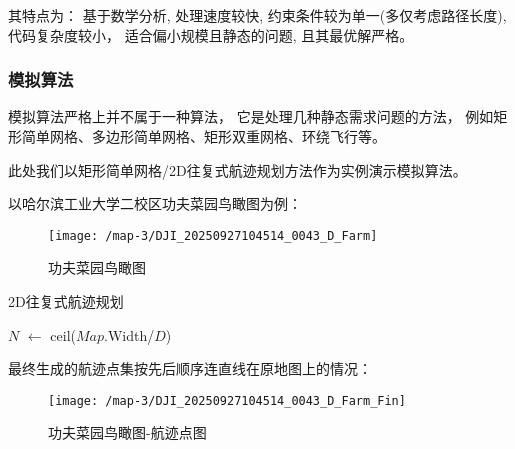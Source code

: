 \documentclass[12pt,a4paper,oneside,UTF8]{ctexart}
\begin{document}
其特点为：
基于数学分析,
处理速度较快,
约束条件较为单一(多仅考虑路径长度),
代码复杂度较小，
适合偏小规模且静态的问题,
且其最优解严格。

\subsubsection{模拟算法}
模拟算法严格上并不属于一种算法，
它是处理几种静态需求问题的方法，
例如矩形简单网格、多边形简单网格、矩形双重网格、环绕飞行等。

此处我们以矩形简单网格/2D往复式航迹规划方法作为实例演示模拟算法。

以哈尔滨工业大学二校区功夫菜园鸟瞰图为例：

\begin{figure}[H]
  \centering
  \texttt{[image: /map-3/DJI\_20250927104514\_0043\_D\_Farm]}
  \caption{功夫菜园鸟瞰图}
  \label{fig:map-3-farm}
\end{figure}

\begin{algorithm}[H]
  \caption{2D往复式航迹规划}\label{traditional-simulation}

  $N$ $\leftarrow$ ceil($Map$.Width/$D$)\;
\end{algorithm}

最终生成的航迹点集按先后顺序连直线在原地图上的情况：

\begin{figure}[H]
  \centering
  \texttt{[image: /map-3/DJI\_20250927104514\_0043\_D\_Farm\_Fin]}
  \caption{功夫菜园鸟瞰图-航迹点图}
  \label{fig:map-3-farm-fin}
\end{figure}
\end{document}
